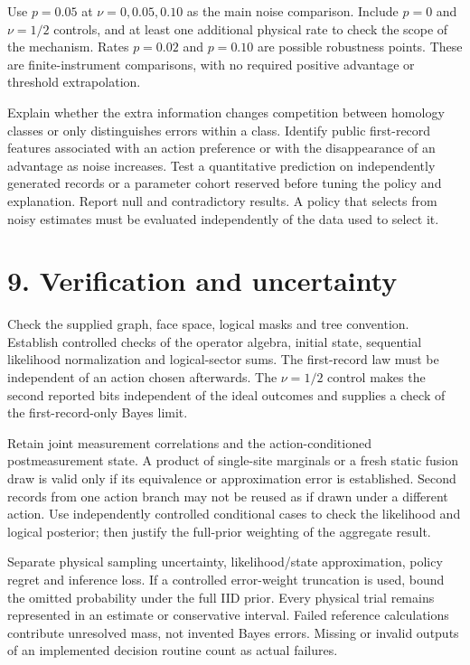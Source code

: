 \documentclass[11pt,letterpaper]{article}
\begin{document}
Use $p=0.05$ at $\nu=0,0.05,0.10$ as the main noise comparison. Include $p=0$ and $\nu=1/2$ controls, and at least one additional physical rate to check the scope of the mechanism. Rates $p=0.02$ and $p=0.10$ are possible robustness points. These are finite-instrument comparisons, with no required positive advantage or threshold extrapolation.\par

Explain whether the extra information changes competition between homology classes or only distinguishes errors within a class. Identify public first-record features associated with an action preference or with the disappearance of an advantage as noise increases. Test a quantitative prediction on independently generated records or a parameter cohort reserved before tuning the policy and explanation. Report null and contradictory results. A policy that selects from noisy estimates must be evaluated independently of the data used to select it.\par

\section*{9. Verification and uncertainty}

Check the supplied graph, face space, logical masks and tree convention. Establish controlled checks of the operator algebra, initial state, sequential likelihood normalization and logical-sector sums. The first-record law must be independent of an action chosen afterwards. The $\nu=1/2$ control makes the second reported bits independent of the ideal outcomes and supplies a check of the first-record-only Bayes limit.\par

Retain joint measurement correlations and the action-conditioned postmeasurement state. A product of single-site marginals or a fresh static fusion draw is valid only if its equivalence or approximation error is established. Second records from one action branch may not be reused as if drawn under a different action. Use independently controlled conditional cases to check the likelihood and logical posterior; then justify the full-prior weighting of the aggregate result.\par

Separate physical sampling uncertainty, likelihood/state approximation, policy regret and inference loss. If a controlled error-weight truncation is used, bound the omitted probability under the full IID prior. Every physical trial remains represented in an estimate or conservative interval. Failed reference calculations contribute unresolved mass, not invented Bayes errors. Missing or invalid outputs of an implemented decision routine count as actual failures.\par
\end{document}
